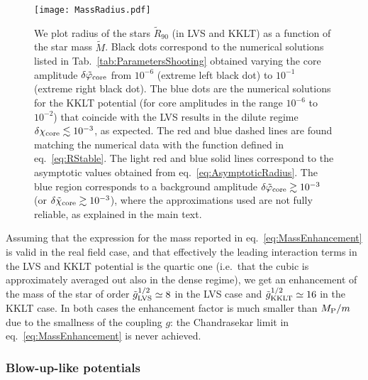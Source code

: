 \documentclass[11pt,a4paper]{article}
\begin{document}
\begin{figure}[h!]
\begin{center}
\texttt{[image: MassRadius.pdf]}
\caption{We plot radius of the stars $\tilde{R}_{90}$ (in LVS and KKLT) as a function of the star mass $\tilde{M}$. Black dots correspond to the numerical solutions listed in Tab.~\ref{tab:ParametersShooting} obtained varying the core amplitude $\delta\tilde\varphi_{\rm core}$ from $10^{-6}$ (extreme left black dot) to $10^{-1}$ (extreme right black dot). The blue dots are the numerical solutions for the KKLT potential (for core amplitudes in the range $10^{-6}$ to $10^{-2}$) that coincide with the LVS results in the dilute regime $\delta\chi_{\rm core} \lesssim 10^{-3}$, as expected. The red and blue dashed lines are found matching the numerical data with the function defined in eq.~\eqref{eq:RStable}. The light red and blue solid lines correspond to the asymptotic values obtained from eq.~\eqref{eq:AsymptoticRadius}. The blue region corresponds to a background amplitude $\delta\tilde\varphi_{\rm core} \gtrsim 10^{-3}$ (or $\delta\tilde\chi_{\rm core} \gtrsim 10^{-3}$), where the approximations used are not fully reliable, as explained in the main text. \label{fig:MassRadiusPlot}}
\end{center}
\end{figure}
Assuming that the expression for the mass reported in eq.~\eqref{eq:MassEnhancement} is valid in the real field case, and that effectively the leading interaction terms in the LVS and KKLT potential is the quartic one (i.e.~that the cubic is approximately averaged out also in the dense regime), we get an enhancement of the mass of the star of order $\tilde{g}^{1/2}_{\rm LVS} \simeq 8$ in the LVS case and $\tilde{g}^{1/2}_{\rm KKLT} \simeq 16$ in the KKLT case. In both cases the enhancement factor is much smaller than $M_{\rm P}/m$ due to the smallness of the coupling $g$: the Chandrasekar limit in eq.~\eqref{eq:MassEnhancement} is never achieved.

\subsubsection{Blow-up-like potentials}
\end{document}
